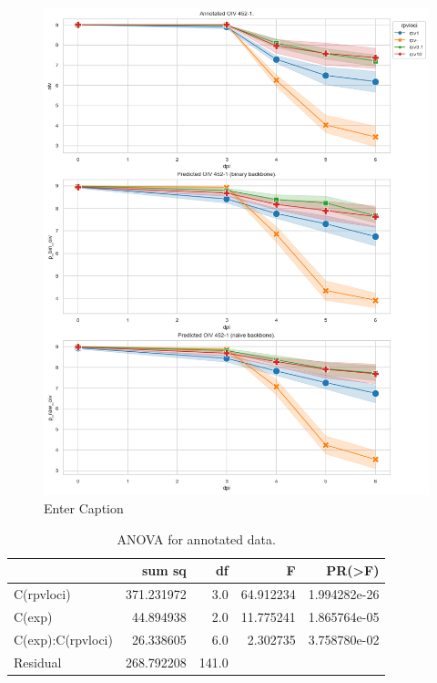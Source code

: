 \documentclass[english]{article}
\begin{document}
\begin{figure}[H]
    \centering
    \includegraphics[width=0.9\linewidth]{p_viticola//resources//images/disease_progression_v4.png}
    \caption{Enter Caption}
    \label{fig:enter-label}
\end{figure}


\begin{table}[H]
    \centering
    \caption{ANOVA for annotated data.}
    \label{tab:anovaanno}
    \begin{tabular}{lrrrr}
        \toprule
        {}                & sum sq     & df    & F         & PR(>F)       \\
        \midrule
        C(rpvloci)        & 371.231972 & 3.0   & 64.912234 & 1.994282e-26 \\
        C(exp)            & 44.894938  & 2.0   & 11.775241 & 1.865764e-05 \\
        C(exp):C(rpvloci) & 26.338605  & 6.0   & 2.302735  & 3.758780e-02 \\
        Residual          & 268.792208 & 141.0 &           &              \\
        \bottomrule
    \end{tabular}
\end{table}
\end{document}
